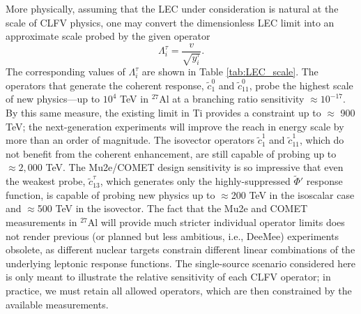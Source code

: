 \documentclass{book}[letterpaper,12pt]
\begin{document}
More physically, assuming that the LEC under consideration is natural at the scale of CLFV physics, one may convert the dimensionless LEC limit into an approximate scale probed by the given operator
\begin{equation}
\Lambda_i^{\tau}=\frac{v}{\sqrt{y_i^{\tau}}}.
\end{equation}
The corresponding values of $\Lambda_i^{\tau}$ are shown in Table \ref{tab:LEC_scale}. The operators that generate the coherent response, $\tilde{c}_1^0$ and $\tilde{c}_{11}^0$, probe the highest scale of new physics---up to $10^4$ TeV in $^{27}$Al at a branching ratio sensitivity $\approx 10^{-17}$. By this same measure, the existing limit in Ti provides a constraint up to $\approx$ 900 TeV; the next-generation experiments will improve the reach in energy scale by more than an order of magnitude. The isovector operators $\tilde{c}_1^1$ and $\tilde{c}_{11}^1$, which do not benefit from the coherent enhancement, are still capable of probing up to $\approx 2,000$ TeV. The Mu2e/COMET design sensitivity is so impressive that even the weakest probe, $\tilde{c}_{13}^{\tau}$, which generates only the highly-suppressed $\tilde{\Phi}'$ response function, is capable of probing new physics up to $\approx$200 TeV in the isoscalar case and $\approx$500 TeV in the isovector. The fact that the Mu2e and COMET measurements in $^{27}$Al will provide much stricter individual operator limits does not render previous (or planned but less ambitious, i.e., DeeMee) experiments obsolete, as different nuclear targets constrain different linear combinations of the underlying leptonic response functions. The single-source scenario considered here is only meant to illustrate the relative sensitivity of each CLFV operator; in practice, we must retain all allowed operators, which are then constrained by the available measurements.
\end{document}
